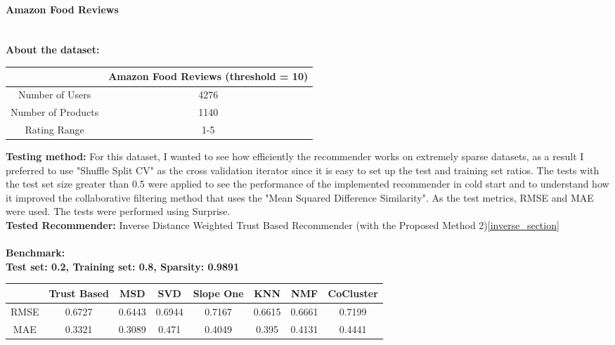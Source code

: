 	\paragraph{Amazon Food Reviews \cite{Amazonfoodreviews}} \mbox{}\\
	\textbf{About the dataset:} 
	\begin{center}
		\begin{tabular}{ | c | c |}
			\hline
			&Amazon Food Reviews (threshold = 10)  \\  
			\hline
			Number of Users & 4276 \\
			\hline
			Number of Products & 1140 \\
			\hline
			Rating Range & 1-5 \\
			\hline
		\end{tabular}
	\end{center} 
	\vspace{0.5cm}
	\textbf{Testing method:} For this dataset, I wanted to see how efficiently the recommender works on extremely sparse datasets, as a result I preferred to use "Shuffle Split CV" as the cross validation iterator since it is easy to set up the test and training set ratios. The tests with the test set size greater than 0.5 were applied to see the performance of the implemented recommender in cold start and to understand how it improved the collaborative filtering method that uses the "Mean Squared Difference Similarity". As the test metrics, RMSE and MAE were used. The tests were performed using Surprise.\\
	\textbf{Tested Recommender:} Inverse Distance Weighted Trust Based Recommender (with the Proposed Method 2)\ref{inverse_section} \\ \\
	\textbf{Benchmark:} \\
	\textbf{Test set: 0.2, Training set: 0.8, Sparsity: 0.9891}
	\begin{center}
		\begin{tabular}{ | c | c | c | c | c | c | c | c |}
			\hline
			& Trust Based & MSD & SVD & Slope One & KNN & NMF & CoCluster\\ 
			\hline
			RMSE&0.6727  & 0.6443  & 0.6944  & 0.7167  & 0.6615  & 0.6661  & 0.7199\\
			\hline
			MAE&0.3321  & 0.3089  & 0.471  & 0.4049  & 0.395  & 0.4131  & 0.4441\\
			\hline
		\end{tabular}
	\end{center} 
	\vspace{1cm}

